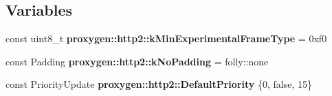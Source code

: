 \subsection*{Variables}
\begin{DoxyCompactItemize}
\item 
const uint8\+\_\+t {\bf proxygen\+::http2\+::k\+Min\+Experimental\+Frame\+Type} = 0xf0
\item 
const Padding {\bf proxygen\+::http2\+::k\+No\+Padding} = folly\+::none
\item 
const Priority\+Update {\bf proxygen\+::http2\+::\+Default\+Priority} \{0, false, 15\}
\end{DoxyCompactItemize}
